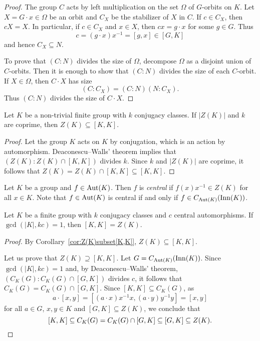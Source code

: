 \begin{proof}
  The group $C$ acts by left multiplication on the set $\Omega$ of
  $G$-orbits on $K$. Let $X=G\cdot x\in\Omega$ be an orbit and $C_X$ be the stabilizer of $X$ 
  in $C$. If $c\in C_X$, then $cX=X$. In particular, if $c\in C_X$ and $x\in X$, then 
  $cx=g\cdot x$ for some $g\in G$. Thus 
  \[
  c=(g\cdot
  x)x^{-1}=[g,x]\in [G,K]
  \]
  and hence $C_X\subseteq N$.

  To prove that $(C:N)$ divides the size of $\Omega$, 
  decompose $\Omega$ as a disjoint union of $C$-orbits. Then 
  it is enough to show that 
  $(C:N)$ divides the size of each $C$-orbit. If $X\in\Omega$, then $C\cdot
  X$ has size 
  \[
	(C:C_X)=(C:N)(N:C_X).
  \]
  Thus $(C:N)$ divides the size of $C\cdot X$.
\end{proof}

\begin{corollary}
  \label{cor:Z(K)subset[K,K]}
  Let $K$ be a non-trivial finite group with $k$ conjugacy classes. If 
  $|Z(K)|$ and $k$ are coprime, then  
  $Z(K)\subseteq[K,K]$.
\end{corollary}

\begin{proof}
	Let the group $K$ acts on $K$ by conjugation, which is an action by automorphism. 
	Deaconescu--Walls' theorem implies that 
	$(Z(K):Z(K)\cap [K,K])$ divides $k$. Since $k$ and $|Z(K)|$ are coprime, it follows that 
	$Z(K)=Z(K)\cap [K,K]\subseteq [K,K]$. 
\end{proof}

Let $K$ be a group and $f\in\operatorname{Aut}(K)$. Then $f$ is {\em central} if
$f(x)x^{-1}\in Z(K)$ for all $x\in K$. Note that $f\in\operatorname{Aut}(K)$ is central
if and only if $f\in C_{\operatorname{Aut}(K)}(\mathrm{Inn}(K))$.

\begin{corollary}
	Let $K$ be a finite group with $k$ conjugacy classes and $c$ central automorphisms. 
	If $\gcd(|K|,kc)=1$, then $[K,K]=Z(K)$.
\end{corollary}

\begin{proof}
	By Corollary~\ref{cor:Z(K)subset[K,K]}, $Z(K)\subseteq [K,K]$. 
	
	Let us prove
	that $Z(K)\supseteq [K,K]$. Let 
	$G=C_{\operatorname{Aut}(K)}(\mathrm{Inn}(K))$. Since $\gcd(|K|, kc)=1$ and, by  Deaconescu--Walls' theorem, 
	$(C_K(G):C_K(G)\cap [G,K])$ divides $c$, 
	 it follows that $C_K(G)=C_K(G)\cap [G,K]$. 
	Since $[K,K]\subseteq C_K(G)$, as 
	\[
		a\cdot [x,y]=[(a\cdot x)x^{-1}x,(a\cdot y)y^{-1}y]=[x,y]
	\]
	for all $a\in G$, $x,y\in K$ and $[G,K]\subseteq Z(K)$, we conclude that 
	\[
	[K,K]\subseteq C_K(G)=C_K(G)\cap [G,K]\subseteq [G,K]\subseteq Z(K).\qedhere 
	\]
\end{proof}

